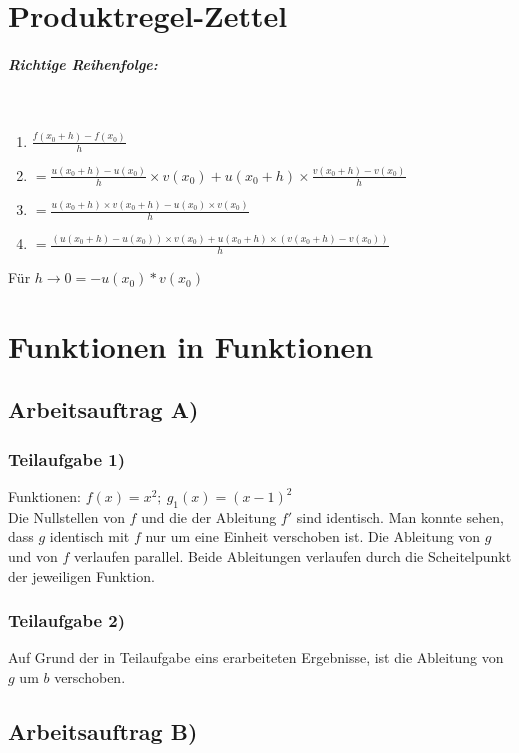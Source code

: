 \documentclass[11pt, a4paper]{report}
\begin{document}
	
	\chapter{Produktregel-Zettel}
	
	\paragraph{Richtige Reihenfolge:} \mbox{} \\
	
	\begin{enumerate}
		\item 	$\frac{f(x_0 + h) - f(x_0)}{h}$
		\item $= \frac{u(x_0 + h) - u(x_0)}{h} \times v (x_0) + u(x_0 + h) \times \frac{v(x_0 +h) - v(x_0)}{h}$
		\item $= \frac{u(x_0 + h) \times v(x_0 + h) - u(x_0) \times v(x_0)}{h}$
		\item $= \frac{(u(x_0 + h) - u(x_0)) \times v(x_0) + u(x_0 + h) \times (v(x_0 + h) - v(x_0))}{h}$
	\end{enumerate}
	
	Für $h \to 0 = -u(x_0)*v(x_0)$
	
	\chapter{Funktionen in Funktionen}
	\section{Arbeitsauftrag A)}
	\subsection{Teilaufgabe 1)}
	Funktionen: $f(x) = x^2;\ g_1(x) = (x - 1)^2$ \\
	Die Nullstellen von $f$ und die der Ableitung $f'$ sind identisch.
	Man konnte sehen, dass $g$ identisch mit $f$ nur um eine Einheit verschoben ist.
	Die Ableitung von $g$ und von $f$ verlaufen parallel.
	Beide Ableitungen verlaufen durch die Scheitelpunkt der jeweiligen Funktion.
	\subsection{Teilaufgabe 2)}
	Auf Grund der in Teilaufgabe eins erarbeiteten Ergebnisse, ist die Ableitung von $g$ um $b$ verschoben.
	\section{Arbeitsauftrag B)}
\end{document}
